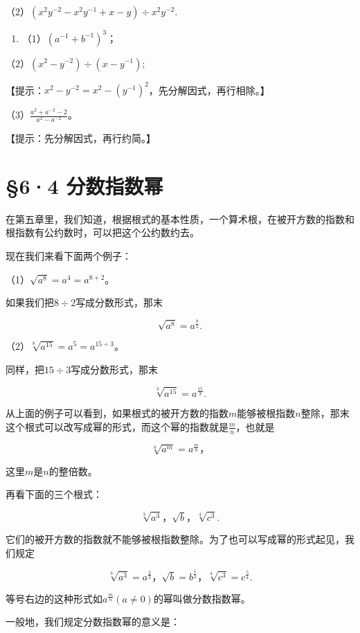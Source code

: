 （2）\((x^{2}y^{-2} - x^{2}y^{-1} + x - y)\div x^{2}y^{-2}.\)

\begin{enumerate}[start=7]
\item
  （1）\((a^{-1} + b^{-1})^3\)；
\end{enumerate}

（2）\((x^{2} - y^{-2})\div (x - y^{-1});\)

【提示：\(x^{2} - y^{-2} = x^{2} - (y^{-1})^{2}\)，先分解因式，再行相除。】

（3）\(\frac{a^2 + a^{-2} - 2}{a^2 - a^{-2}}\)。

【提示：先分解因式，再行约简。】

\section{§6·4 分数指数幂}

在第五章里，我们知道，根据根式的基本性质，一个算术根，在被开方数的指数和根指数有公约数时，可以把这个公约数约去。

现在我们来看下面两个例子：

（1）\(\sqrt{a^8} = a^4 = a^{8 + 2}\)。

如果我们把\(8 \div 2\)写成分数形式，那末

\[
\sqrt {a ^ {8}} = a ^ {\frac{8}{2}}.
\]

（2）\(\sqrt[8]{a^{15}} = a^5 = a^{15 \div 3}\)。

同样，把\(15 \div 3\)写成分数形式，那末

\[
\sqrt[3]{a ^ {15}} = a ^ {\frac{15}{3}}.
\]

从上面的例子可以看到，如果根式的被开方数的指数\(m\)能够被根指数\(n\)整除，那末这个根式可以改写成幂的形式，而这个幂的指数就是\(\frac{m}{n}\)，也就是

\[
\sqrt[n]{a ^ {m}} = a ^ {\frac{m}{n}}\text{，}
\]

这里\(m\)是\(n\)的整倍数。

再看下面的三个根式：

\[
\sqrt[3]{a ^ {3}}\text{，} \sqrt {b}\text{，} \sqrt[4]{c ^ {3}}.
\]

它们的被开方数的指数就不能够被根指数整除。为了也可以写成幂的形式起见，我们规定

\[
\sqrt[3]{a ^ {3}} = a ^ {\frac{2}{3}}\text{，} \sqrt {b} = b ^ {\frac{1}{2}}\text{，} \sqrt[4]{c ^ {3}} = c ^ {\frac{5}{4}}.
\]

等号右边的这种形式如\(a^{\frac{m}{n}} (a \neq 0)\)的幂叫做分数指数幂。

一般地，我们规定分数指数幂的意义是：

